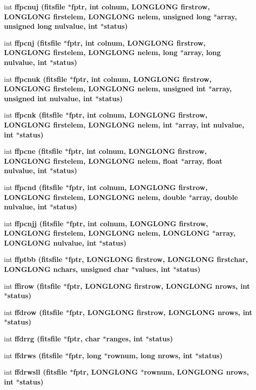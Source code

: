 \begin{CompactItemize}
\item 
int \bf{ffpcnuj} (\bf{fitsfile} $\ast$fptr, int colnum, \bf{LONGLONG} firstrow, \bf{LONGLONG} firstelem, \bf{LONGLONG} nelem, unsigned long $\ast$array, unsigned long nulvalue, int $\ast$status)
\item 
int \bf{ffpcnj} (\bf{fitsfile} $\ast$fptr, int colnum, \bf{LONGLONG} firstrow, \bf{LONGLONG} firstelem, \bf{LONGLONG} nelem, long $\ast$array, long nulvalue, int $\ast$status)
\item 
int \bf{ffpcnuk} (\bf{fitsfile} $\ast$fptr, int colnum, \bf{LONGLONG} firstrow, \bf{LONGLONG} firstelem, \bf{LONGLONG} nelem, unsigned int $\ast$array, unsigned int nulvalue, int $\ast$status)
\item 
int \bf{ffpcnk} (\bf{fitsfile} $\ast$fptr, int colnum, \bf{LONGLONG} firstrow, \bf{LONGLONG} firstelem, \bf{LONGLONG} nelem, int $\ast$array, int nulvalue, int $\ast$status)
\item 
int \bf{ffpcne} (\bf{fitsfile} $\ast$fptr, int colnum, \bf{LONGLONG} firstrow, \bf{LONGLONG} firstelem, \bf{LONGLONG} nelem, float $\ast$array, float nulvalue, int $\ast$status)
\item 
int \bf{ffpcnd} (\bf{fitsfile} $\ast$fptr, int colnum, \bf{LONGLONG} firstrow, \bf{LONGLONG} firstelem, \bf{LONGLONG} nelem, double $\ast$array, double nulvalue, int $\ast$status)
\item 
int \bf{ffpcnjj} (\bf{fitsfile} $\ast$fptr, int colnum, \bf{LONGLONG} firstrow, \bf{LONGLONG} firstelem, \bf{LONGLONG} nelem, \bf{LONGLONG} $\ast$array, \bf{LONGLONG} nulvalue, int $\ast$status)
\item 
int \bf{ffptbb} (\bf{fitsfile} $\ast$fptr, \bf{LONGLONG} firstrow, \bf{LONGLONG} firstchar, \bf{LONGLONG} nchars, unsigned char $\ast$values, int $\ast$status)
\item 
int \bf{ffirow} (\bf{fitsfile} $\ast$fptr, \bf{LONGLONG} firstrow, \bf{LONGLONG} nrows, int $\ast$status)
\item 
int \bf{ffdrow} (\bf{fitsfile} $\ast$fptr, \bf{LONGLONG} firstrow, \bf{LONGLONG} nrows, int $\ast$status)
\item 
int \bf{ffdrrg} (\bf{fitsfile} $\ast$fptr, char $\ast$ranges, int $\ast$status)
\item 
int \bf{ffdrws} (\bf{fitsfile} $\ast$fptr, long $\ast$rownum, long nrows, int $\ast$status)
\item 
int \bf{ffdrwsll} (\bf{fitsfile} $\ast$fptr, \bf{LONGLONG} $\ast$rownum, \bf{LONGLONG} nrows, int $\ast$status)
\item 

\end{CompactItemize}
